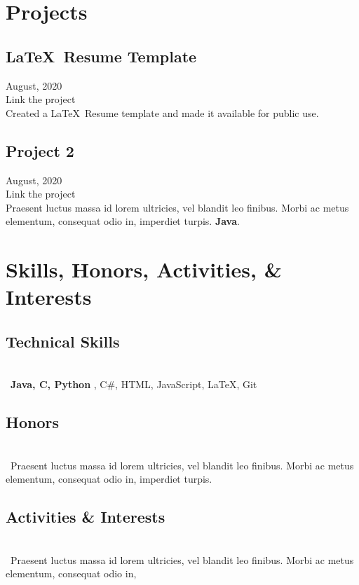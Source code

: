 \documentclass{article}
\begin{document}

\section{Projects}

\subsection{\LaTeX \ Resume Template}
\hfill August, 2020
\ \\
Link the project\\
Created a \LaTeX \ Resume template and made it available for public use. 
\subsection{Project 2}
\hfill August, 2020
\ \\
Link the project\\
Praesent luctus massa id lorem ultricies, vel blandit leo finibus. Morbi ac metus elementum, consequat odio in, imperdiet turpis.  {\bfseries Java}. 


\section{Skills, Honors, Activities, \& Interests}

\subsection{Technical Skills}
\ \\
\ {\bfseries Java, C, Python} , C\#, HTML, JavaScript, \LaTeX, Git


\subsection{Honors}
\ \\
\  Praesent luctus massa id lorem ultricies, vel blandit leo finibus. Morbi ac metus elementum, consequat odio in, imperdiet turpis. 
\subsection{Activities \& Interests}
\ \\
\  Praesent luctus massa id lorem ultricies, vel blandit leo finibus. Morbi ac metus elementum, consequat odio in, 
\end{document}
